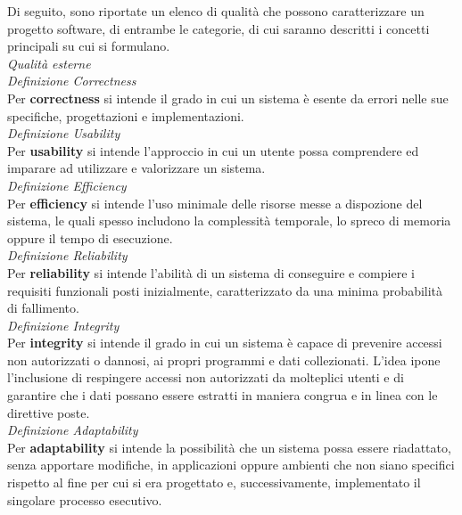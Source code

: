 \documentclass{article}
\begin{document}
Di seguito, sono riportate un elenco di qualità che possono caratterizzare un progetto software, di entrambe le categorie, di cui saranno descritti i concetti principali su cui si formulano.\vspace*{14pt}\\
\textit{Qualità esterne}\\
\textit{Definizione Correctness}\\
Per \textbf{correctness} si intende il grado in cui un sistema è esente da errori nelle sue specifiche, progettazioni e implementazioni.\vspace*{14pt}\\
\textit{Definizione Usability}\\
Per \textbf{usability} si intende l'approccio in cui un utente possa comprendere ed imparare ad utilizzare e valorizzare un sistema.\vspace*{14pt}\\
\textit{Definizione Efficiency}\\
Per \textbf{efficiency} si intende l'uso minimale delle risorse messe a dispozione del sistema, le quali spesso includono la complessità temporale, lo spreco di memoria oppure il tempo di esecuzione.\vspace*{14pt}\\
\textit{Definizione Reliability}\\
Per \textbf{reliability} si intende l'abilità di un sistema di conseguire e compiere i requisiti funzionali posti inizialmente, caratterizzato da una minima probabilità di fallimento.\vspace*{14pt}\\
\textit{Definizione Integrity}\\
Per \textbf{integrity} si intende il grado in cui un sistema è capace di prevenire accessi non autorizzati o dannosi, ai propri programmi e dati collezionati. L'idea ipone l'inclusione di respingere accessi non autorizzati da molteplici utenti e di garantire che i dati possano essere estratti in maniera congrua e in linea con le direttive poste.\vspace*{14pt}\\
\textit{Definizione Adaptability}\\
Per \textbf{adaptability} si intende la possibilità che un sistema possa essere riadattato, senza apportare modifiche, in applicazioni oppure ambienti che non siano specifici rispetto al fine per cui si era progettato e, successivamente, implementato il singolare processo esecutivo.\vspace*{14pt}\\
\end{document}
